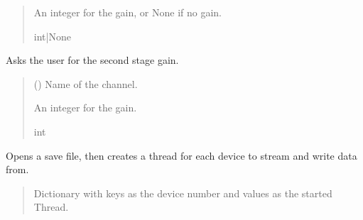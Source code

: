 \documentclass[letterpaper,10pt,english]{sphinxmanual}
\begin{document}
\begin{fulllineitems}
\begin{fulllineitems}
\begin{quote}
\begin{description}
\sphinxAtStartPar
An integer for the gain, or None if no gain.

\sphinxAtStartPar
int|None

\end{description}\end{quote}

\end{fulllineitems}


\begin{fulllineitems}
\label{\detokenize{Setup_8401HR:Setup_8401HR.Setup_8401HR._SetSSGain}}
\pysigstartsignatures
{}
\pysigstopsignatures
\sphinxAtStartPar
Asks the user for the second stage gain.
\begin{quote}\begin{description}
\sphinxAtStartPar
{} () \textendash{} Name of the channel.

\sphinxAtStartPar
An integer for the gain.

\sphinxAtStartPar
int

\end{description}\end{quote}

\end{fulllineitems}


\begin{fulllineitems}
\label{\detokenize{Setup_8401HR:Setup_8401HR.Setup_8401HR._StreamThreading}}
\pysigstartsignatures
{}
\pysigstopsignatures
\sphinxAtStartPar
Opens a save file, then creates a thread for each device to stream and write         data from.
\begin{quote}\begin{description}
\sphinxAtStartPar
Dictionary with keys as the device number and values as                 the started Thread.


\end{description}
\end{quote}
\end{fulllineitems}
\end{fulllineitems}
\end{document}
